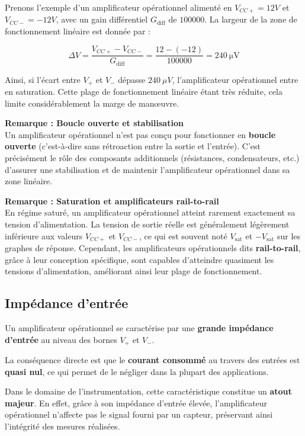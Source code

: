 Prenons l'exemple d'un amplificateur opérationnel alimenté en \(V_{CC+}=12V\) 
et \( V_{CC-} = -12V \), avec un gain différentiel \( G_{\text{diff}} \) de 
\( 100000 \). La largeur de la zone de fonctionnement linéaire est donnée par :

\[
\Delta V = \frac{V_{CC+} - V_{CC-}}{G_{\text{diff}}} = \frac{12 - (-12)}{100000} = \SI{240}{\micro\volt}
\]

Ainsi, si l'écart entre \( V_+ \) et \( V_- \) dépasse \( 240\ \mu V \), 
l'amplificateur opérationnel entre en saturation. Cette plage de fonctionnement 
linéaire étant très réduite, cela limite considérablement la marge de manœuvre.

\textbf{Remarque : Boucle ouverte et stabilisation}\\
Un amplificateur opérationnel n'est pas conçu pour fonctionner en 
\textbf{boucle ouverte} (c'est-à-dire sans rétroaction entre la sortie et 
l'entrée). C'est précisément le rôle des composants additionnels (résistances, 
condensateurs, etc.) d'assurer une stabilisation et de maintenir l'amplificateur 
opérationnel dans sa zone linéaire.

\textbf{Remarque : Saturation et amplificateurs rail-to-rail}\\
En régime saturé, un amplificateur opérationnel atteint rarement exactement sa 
tension d'alimentation. La tension de sortie réelle est généralement légèrement 
inférieure aux valeurs \( V_{CC+} \) et \( V_{CC-} \), ce qui est souvent noté 
\( V_{\text{sat}} \) et \( -V_{\text{sat}} \) sur les graphes de réponse. 
Cependant, les amplificateurs opérationnels dits \textbf{rail-to-rail}, grâce à 
leur conception spécifique, sont capables d'atteindre quasiment les tensions 
d'alimentation, améliorant ainsi leur plage de fonctionnement.

\subsection{Impédance d'entrée}
Un amplificateur opérationnel se caractérise par une 
\textbf{grande impédance d’entrée} au niveau des bornes \( V_+ \) et \( V_- \). 

La conséquence directe est que le \textbf{courant consommé} au travers des 
entrées est \textbf{quasi nul}, ce qui permet de le négliger dans la plupart des 
applications.

Dans le domaine de l’instrumentation, cette caractéristique constitue un 
\textbf{atout majeur}. En effet, grâce à son impédance d’entrée élevée, 
l’amplificateur opérationnel n'affecte pas le signal fourni par un capteur, 
préservant ainsi l’intégrité des mesures réalisées. 

